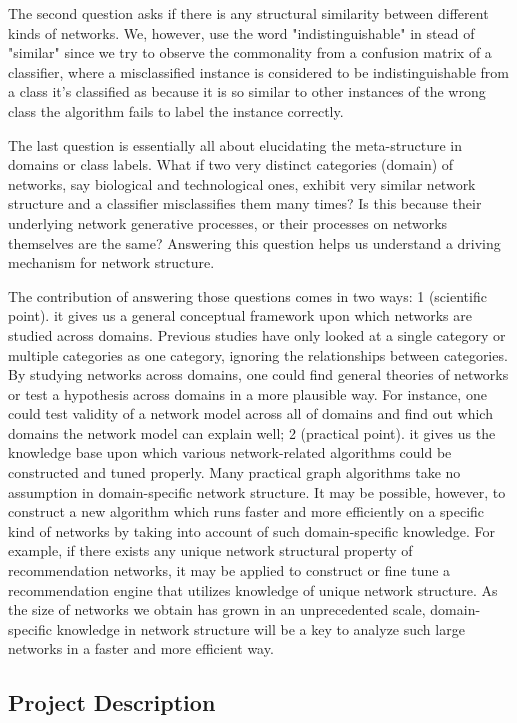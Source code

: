 \documentclass{article}
\begin{document}
The second question asks if there is any structural similarity between different kinds of networks. We, however, use the word "indistinguishable" in stead of "similar" since we try to observe the commonality from a confusion matrix of a classifier, where a misclassified instance is considered to be indistinguishable from a class it's classified as because it is so similar to other instances of the wrong class the algorithm fails to label the instance correctly.


The last question is essentially all about elucidating the meta-structure in domains or class labels. What if two very distinct categories (domain) of networks, say biological and technological ones, exhibit very similar network structure and a classifier misclassifies them many times? Is this because their underlying network generative processes, or their processes on networks themselves are the same? Answering this question helps us understand a driving mechanism for network structure.


The contribution of answering those questions comes in two ways: 1 (scientific point). it gives us a general conceptual framework upon which networks are studied across domains. Previous studies have only looked at a single category or multiple categories as one category, ignoring the relationships between categories. By studying networks across domains, one could find general theories of networks or test a hypothesis across domains in a more plausible way.  For instance, one could test validity of a network model across all of domains and find out which domains the network model can explain well; 2 (practical point). it gives us the knowledge base upon which various network-related algorithms could be constructed and tuned properly.  Many practical graph algorithms take no assumption in domain-specific network structure. It may be possible, however, to construct a new algorithm which runs faster and more efficiently on a specific kind of networks by taking into account of such domain-specific knowledge. For example, if there exists any unique network structural property of recommendation networks,  it may be applied to construct or fine tune a recommendation engine that utilizes knowledge of unique network structure. As the size of networks we obtain has grown in an unprecedented scale, domain-specific knowledge in network structure will be a key to analyze such large networks in a faster and more efficient way.

\subsection{Project Description}
\end{document}
